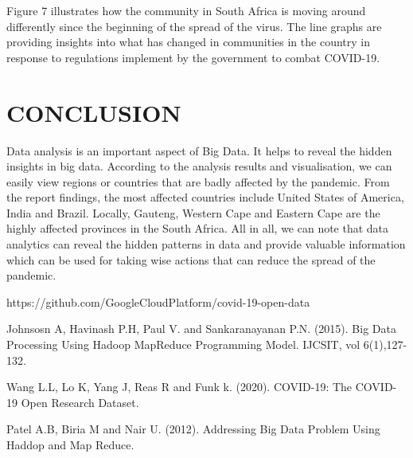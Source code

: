 \documentclass[12pt]{article}
\begin{document}
Figure 7 illustrates how the community in South Africa is moving around differently since the beginning of the spread of the virus. The line graphs are providing insights into what has changed in communities in the country in response to regulations implement by the government to combat COVID-19. 

\section{CONCLUSION}
Data analysis is an important aspect of Big Data. It helps to reveal the hidden insights in big data. According to the analysis results and visualisation, we can easily view regions or countries that are badly affected by the pandemic. From the report findings, the most affected countries include United States of America, India and Brazil. Locally, Gauteng, Western Cape and Eastern Cape are the highly affected provinces in the South Africa. All in all, we can note that data analytics can reveal the hidden patterns in data and provide valuable information which can be used for taking wise actions that can reduce the spread of the pandemic.

\begin{thebibliography}{11}
https://github.com/GoogleCloudPlatform/covid-19-open-data

Johnsosn A, Havinash P.H, Paul V. and Sankaranayanan P.N. (2015). Big Data Processing Using Hadoop MapReduce Programming Model. IJCSIT, vol 6(1),127-132.

Wang L.L, Lo K, Yang J, Reas R and Funk k. (2020). COVID-19: The COVID-19 Open Research Dataset.

Patel A.B, Biria M and Nair U. (2012). Addressing Big Data Problem Using Haddop and Map Reduce.

\end{thebibliography}
\end{document}
